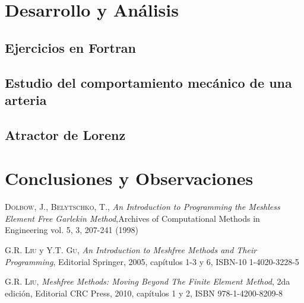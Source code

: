 \documentclass[letterpaper]{article}
\begin{document}





\newpage
\section{Desarrollo y Análisis}
\subsection{Ejercicios en Fortran}

\subsection{Estudio del comportamiento mecánico de una arteria}

\subsection{Atractor de Lorenz}


\newpage
\section{Conclusiones y Observaciones}

\newpage

\begin{thebibliography}{3}
 \textsc{Dolbow, J., Belytschko, T.,} \textit{An Introduction to Programming the Meshless Element Free Garlekin Method},Archives of Computational Methods in Engineering vol. 5, 3, 207-241 (1998)

 \textsc{G.R. Liu} y \textsc{Y.T. Gu}, \textit{An Introduction to Meshfree Methods and Their Programming},
Editorial Springer, 2005, capítulos 1-3 y 6, ISBN-10 1-4020-3228-5

 \textsc{G.R. Liu}, \textit{Meshfree Methods: Moving Beyond The Finite Element Method}, 2da edición,
Editorial CRC Press, 2010, capítulos 1 y 2, ISBN 978-1-4200-8209-8
\end{thebibliography}
\end{document}
